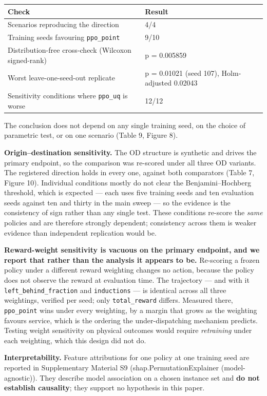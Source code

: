 \documentclass[
]{article}
\begin{document}
\begin{longtable}[]{@{}ll@{}}
\toprule\noalign{}
Check & Result \\
\midrule\noalign{}
\endhead
\bottomrule\noalign{}
\endlastfoot
Scenarios reproducing the direction & 4/4 \\
Training seeds favouring \texttt{ppo\_point} & 9/10 \\
Distribution-free cross-check (Wilcoxon signed-rank) & p = 0.005859 \\
Worst leave-one-seed-out replicate & p = 0.01021 (seed 107),
Holm-adjusted 0.02043 \\
Sensitivity conditions where \texttt{ppo\_uq} is worse & 12/12 \\
\end{longtable}

The conclusion does not depend on any single training seed, on the
choice of parametric test, or on one scenario (Table 9, Figure 8).

\textbf{Origin--destination sensitivity.} The OD structure is synthetic
and drives the primary endpoint, so the comparison was re-scored under
all three OD variants. The registered direction holds in every one,
against both comparators (Table 7, Figure 10). Individual conditions
mostly do not clear the Benjamini--Hochberg threshold, which is expected
--- each uses five training seeds and ten evaluation seeds against ten
and thirty in the main sweep --- so the evidence is the consistency of
sign rather than any single test. These conditions re-score the
\emph{same} policies and are therefore strongly dependent; consistency
across them is weaker evidence than independent replication would be.

\textbf{Reward-weight sensitivity is vacuous on the primary endpoint,
and we report that rather than the analysis it appears to be.}
Re-scoring a frozen policy under a different reward weighting changes no
action, because the policy does not observe the reward at evaluation
time. The trajectory --- and with it \texttt{left\_behind\_fraction} and
\texttt{inductions} --- is identical across all three weightings,
verified per seed; only \texttt{total\_reward} differs. Measured there,
\texttt{ppo\_point} wins under every weighting, by a margin that grows
as the weighting favours service, which is the ordering the
under-dispatching mechanism predicts. Testing weight sensitivity on
physical outcomes would require \emph{retraining} under each weighting,
which this design did not do.

\textbf{Interpretability.} Feature attributions for one policy at one
training seed are reported in Supplementary Material S9
(shap.PermutationExplainer (model-agnostic)). They describe model
association on a chosen instance set and \textbf{do not establish
causality}; they support no hypothesis in this paper.
\end{document}

